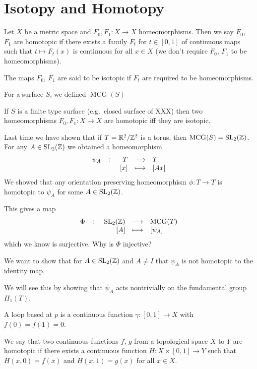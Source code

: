 \documentclass[11pt,a4paper]{article}
\DeclareMathOperator{\MCG}{MCG}
\begin{document}
\newpage

\section{Isotopy and Homotopy}
Let $X$ be a metric space and $F_0, F_1 \colon X \to X$ homeomorphisms.
Then we say $F_0$, $F_1$ are homotopic if there exists a family $F_t$
for $t \in [0,1]$ of continuous maps such that $t \mapsto F_t(x)$ is
continuous for all $x \in X$ (we don't require $F_0$, $F_1$ to be 
homeomorphisms).

The maps $F_0$, $F_1$ are said to be isotopic if $F_t$ are required to
be homeomorphisms.

For a surface $S$, we defined $\MCG(S)$

\begin{theorem}
  If $S$ is a finite type surface (e.g.\ closed surface of XXX)
  then two homeomorphisms $F_0, F_1 \colon X \to X$ are homotopic
  iff they are isotopic.
\end{theorem}

Last time we have shown that if $T = \mathbb{R}^2 / \mathbb{Z}^2$ is a torus,
then $\MCG(S) = \SL_2(\Z)$.
For any $A \in \operatorname{SL}_2(\mathbb{Z})$ we obtained a homeomorphism
\[
  \fullfunction{\psi_A}{T}{T}{[x]}{[Ax]}
\]
We showed that any orientation preserving homeomorphism $\phi \colon T \to T$
is homotopic to $\psi_A$ for some $A \in \operatorname{SL}_2(\mathbb{Z})$.

This gives a map
\[
  \fullfunction{\Phi}{\SL_2(\Z)}{\MCG(T)}{[A]}{[\psi_A]}
\]
which we know is surjective.
Why is $\Phi$ injective?


We want to show that for $A \in \operatorname{SL}_2(\mathbb{Z})$ and $A \neq I$ that $\psi_A$
is not homotopic to the identity map.

We will see this by showing that $\psi_A$ acts nontrivially on the fundamental
group $\Pi_1(T)$.

\begin{definition}[Loop]
  A loop based at $p$ is a continuous function $\gamma \colon [0,1] \to X$ with 
  $f(0) = f(1) = 0$.
\end{definition}

\begin{definition}[Homotopy]
  We say that two continuous functions $f$, $g$ from a topological space $X$
  to $Y$ are homotopic if there exists a continuous function 
  $H \colon X \times [0,1] \to Y$ such that $H(x,0) = f(x)$ and
  $H(x,1) = g(x)$ for all $x \in X$.
\end{definition}
\end{document}
